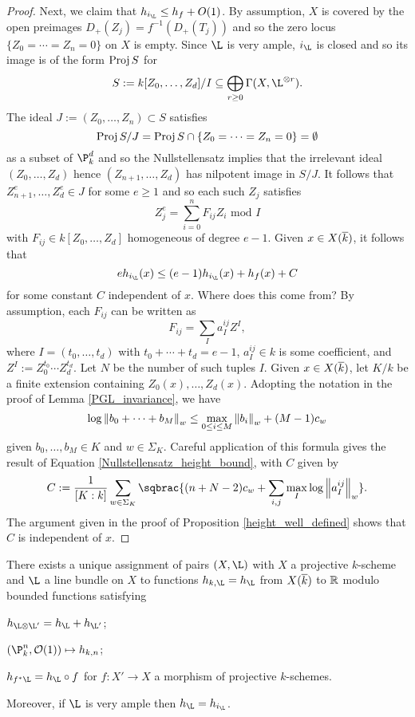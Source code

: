 \documentclass[11pt]{article}
\begin{document}
\begin{proof}
Next, we claim that $h_{i_{\L}}\leq h_f+O(1)$. By assumption, $X$ is covered by the open preimages $D_+(Z_j)=f^{-1}(D_+(T_j))$ and so the zero locus $\{Z_0=\cdots=Z_n=0\}$ on $X$ is empty. Since $\L$ is very ample, $i_{\L}$ is closed and so its image is of the form $\operatorname{Proj} S$ for 
$$S:=k[Z_0,\ldots,Z_d]/I\subset\bigoplus_{r\geq0}\Gamma(X,\L^{\tensor r}).$$
The ideal $J:=(Z_0,\ldots,Z_n)\subset S$ satisfies 
$$\operatorname{Proj} S/J=\operatorname{Proj} S\cap\{Z_0=\cdots=Z_n=0\}=\emptyset$$
as a subset of $\P_k^d$ and so the Nullstellensatz implies that the irrelevant ideal $(Z_0,\ldots,Z_d)$ hence $(Z_{n+1},\ldots,Z_d)$ has nilpotent image in $S/J$. It follows that $Z_{n+1}^e,\ldots,Z_d^e\in J$ for some $e\geq1$ and so each such $Z_j$ satisfies 
$$Z_j^e=\sum_{i=0}^nF_{ij}Z_i\textrm{ mod }I$$
with $F_{ij}\in k[Z_0,\ldots,Z_d]$ homogeneous of degree $e-1$. Given $x\in X(\overline{k})$, it follows that 
\begin{equation}\label{Nullstellensatz_height_bound}
eh_{i_{\L}}(x)\leq(e-1)h_{i_{\L}}(x)+h_f(x)+C
\end{equation}
for some constant $C$ independent of $x$. Where does this come from? By assumption, each $F_{ij}$ can be written as 
$$F_{ij}=\sum_Ia_I^{ij}Z^I,$$
where $I=(t_0,\ldots,t_d)$ with $t_0+\cdots+t_d=e-1$, $a_I^{ij}\in k$ is some coefficient, and $Z^I:=Z_0^{t_0}\cdots Z_d^{t_d}$. Let $N$ be the number of such tuples $I$. Given $x\in X(\overline{k})$, let $K/k$ be a finite extension containing $Z_0(x),\ldots,Z_d(x)$. Adopting the notation in the proof of Lemma \ref{PGL_invariance}, we have
$$\log\left\lVert b_0+\cdots+b_M\right\rVert_w\leq\max_{0\leq i\leq M}\left\lVert b_i\right\rVert_w+(M-1)c_w$$
given $b_0,\ldots,b_M\in K$ and $w\in\Sigma_K$. Careful application of this formula gives the result of Equation \eqref{Nullstellensatz_height_bound}, with $C$ given by 
$$C:=\df{1}{[K:k]}\sum_{w\in\Sigma_K}\sqbrac{(n+N-2)c_w+\sum_{i,j}\max_I\log\norm{a_I^{ij}}_w}.$$
The argument given in the proof of Proposition \ref{height_well_defined} shows that $C$ is independent of $x$.
\end{proof}

\begin{theorem}\label{Weil_Thm}
There exists a unique assignment of pairs $(X,\L)$ with $X$ a projective $k$-scheme and $\L$ a line bundle on $X$ to functions $h_{k,\L}=h_{\L}$ from $X(\overline{k})$ to $\mathbb{R}$ modulo bounded functions satisfying
\begin{enum}{\arabic}
\item $h_{\L\tensor\L'}=h_{\L}+h_{\L'}$;
\item $(\P_k^n,\O(1))\mapsto h_{k,n}$;
\item $h_{f^*\L}=h_{\L}\circ f$ for $f: X'\to X$ a morphism of projective $k$-schemes.
\end{enum}
Moreover, if $\L$ is very ample then $h_{\L}=h_{i_{\L}}$.
\end{theorem}
\end{document}
